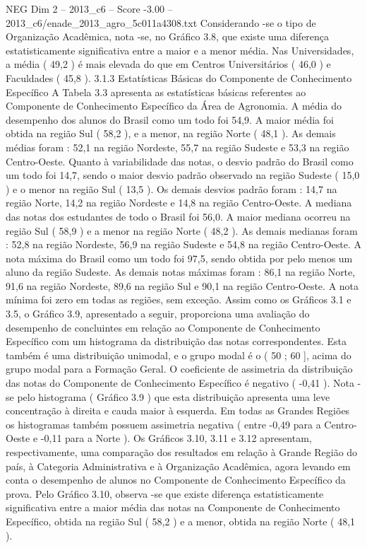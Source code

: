 \begin{textsample}{NEG Dim 2 – 2013\_c6 – Score -3.00 – 2013\_c6/enade\_2013\_agro\_5c011a4308.txt}
Considerando -se o tipo de Organização Acadêmica, nota -se, no Gráfico 3.8, que existe uma diferença estatisticamente significativa entre a maior e a menor média.
Nas Universidades, a média ( 49,2 ) é mais elevada do que em Centros Universitários ( 46,0 ) e Faculdades ( 45,8 ). 3.1.3 Estatísticas Básicas do Componente de Conhecimento Específico A Tabela 3.3 apresenta as estatísticas básicas referentes ao Componente de Conhecimento Específico da Área de Agronomia.
A média do desempenho dos alunos do Brasil como um todo foi 54,9.
A maior média foi obtida na região Sul ( 58,2 ), e a menor, na região Norte ( 48,1 ).
As demais médias foram : 52,1 na região Nordeste, 55,7 na região Sudeste e 53,3 na região Centro-Oeste.
Quanto à variabilidade das notas, o desvio padrão do Brasil como um todo foi 14,7, sendo o maior desvio padrão observado na região Sudeste ( 15,0 ) e o menor na região Sul ( 13,5 ).
Os demais desvios padrão foram : 14,7 na região Norte, 14,2 na região Nordeste e 14,8 na região Centro-Oeste.
A mediana das notas dos estudantes de todo o Brasil foi 56,0.
A maior mediana ocorreu na região Sul ( 58,9 ) e a menor na região Norte ( 48,2 ).
As demais medianas foram : 52,8 na região Nordeste, 56,9 na região Sudeste e 54,8 na região Centro-Oeste.
A nota máxima do Brasil como um todo foi 97,5, sendo obtida por pelo menos um aluno da região Sudeste.
As demais notas máximas foram : 86,1 na região Norte, 91,6 na região Nordeste, 89,6 na região Sul e 90,1 na região Centro-Oeste.
A nota mínima foi zero em todas as regiões, sem exceção.
Assim como os Gráficos 3.1 e 3.5, o Gráfico 3.9, apresentado a seguir, proporciona uma avaliação do desempenho de concluintes em relação ao Componente de Conhecimento Específico com um histograma da distribuição das notas correspondentes.
Esta também é uma distribuição unimodal, e o grupo modal é o ( 50 ; 60 ], acima do grupo modal para a Formação Geral.
O coeficiente de assimetria da distribuição das notas do Componente de Conhecimento Específico é negativo ( -0,41 ).
Nota -se pelo histograma ( Gráfico 3.9 ) que esta distribuição apresenta uma leve concentração à direita e cauda maior à esquerda.
Em todas as Grandes Regiões os histogramas também possuem assimetria negativa ( entre -0,49 para a Centro-Oeste e -0,11 para a Norte ).
Os Gráficos 3.10, 3.11 e 3.12 apresentam, respectivamente, uma comparação dos resultados em relação à Grande Região do país, à Categoria Administrativa e à Organização Acadêmica, agora levando em conta o desempenho de alunos no Componente de Conhecimento Específico da prova.
Pelo Gráfico 3.10, observa -se que existe diferença estatisticamente significativa entre a maior média das notas na Componente de Conhecimento Específico, obtida na região Sul ( 58,2 ) e a menor, obtida na região Norte ( 48,1 ).

\end{textsample}
